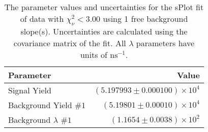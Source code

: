 
\begin{table}
    \begin{center}
        \begin{tabular}{lr}\toprule
            Parameter & Value \\\midrule
            Signal Yield & $(5.197993 \pm 0.000100) \times 10^{4}$ \\
            Background Yield $\#1$ & $(5.19801 \pm 0.00010) \times 10^{4}$ \\
            Background $\lambda$ $\#1$ & $(1.1654 \pm 0.0038) \times 10^{2}$ \\\bottomrule
        \end{tabular}
        \caption{The parameter values and uncertainties for the sPlot fit of data with $\chi^2_\nu < 3.00$ using 1 free background slope(s). Uncertainties are calculated using the covariance matrix of the fit. All $\lambda$ parameters have units of $\si{\nano\second}^{-1}$.}
    \end{center}
\end{table}
